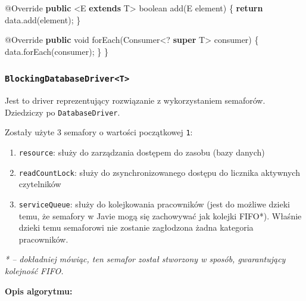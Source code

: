 \documentclass[11pt]{article}
\providecommand{\tightlist}{%
      \setlength{\itemsep}{0pt}\setlength{\parskip}{0pt}}
\newenvironment{Shaded}{}{}
\newcommand{\KeywordTok}[1]{\textcolor[rgb]{0.00,0.44,0.13}{\textbf{{#1}}}}
\newcommand{\DataTypeTok}[1]{\textcolor[rgb]{0.56,0.13,0.00}{{#1}}}
\newcommand{\FunctionTok}[1]{\textcolor[rgb]{0.02,0.16,0.49}{{#1}}}
\newcommand{\NormalTok}[1]{{#1}}
\newcommand{\ControlFlowTok}[1]{\textcolor[rgb]{0.00,0.44,0.13}{\textbf{{#1}}}}
\newcommand{\OperatorTok}[1]{\textcolor[rgb]{0.40,0.40,0.40}{{#1}}}
\newcommand{\AttributeTok}[1]{\textcolor[rgb]{0.49,0.56,0.16}{{#1}}}
\begin{document}
\begin{Shaded}
\begin{Highlighting}[]
    \AttributeTok{@Override}
    \KeywordTok{public} \OperatorTok{\textless{}}\NormalTok{E }\KeywordTok{extends}\NormalTok{ T}\OperatorTok{\textgreater{}} \DataTypeTok{boolean} \FunctionTok{add}\OperatorTok{(}\NormalTok{E element}\OperatorTok{)} \OperatorTok{\{}
        \ControlFlowTok{return}\NormalTok{ data}\OperatorTok{.}\FunctionTok{add}\OperatorTok{(}\NormalTok{element}\OperatorTok{);}
    \OperatorTok{\}}

    \AttributeTok{@Override}
    \KeywordTok{public} \DataTypeTok{void} \FunctionTok{forEach}\OperatorTok{(}\NormalTok{Consumer}\OperatorTok{\textless{}?} \KeywordTok{super}\NormalTok{ T}\OperatorTok{\textgreater{}}\NormalTok{ consumer}\OperatorTok{)} \OperatorTok{\{}
\NormalTok{        data}\OperatorTok{.}\FunctionTok{forEach}\OperatorTok{(}\NormalTok{consumer}\OperatorTok{);}
    \OperatorTok{\}}
\OperatorTok{\}}
\end{Highlighting}
\end{Shaded}

    \hypertarget{blockingdatabasedrivert}{%
\subsubsection{\texorpdfstring{\texttt{BlockingDatabaseDriver\textless{}T\textgreater{}}}{BlockingDatabaseDriver\textless T\textgreater{}}}\label{blockingdatabasedrivert}}

Jest to driver reprezentujący rozwiązanie z wykorzystaniem semaforów.
Dziedziczy po \texttt{DatabaseDriver}.

Zostały użyte 3 semafory o wartości początkowej \texttt{1}:

\begin{enumerate}
\def\labelenumi{\arabic{enumi}.}
\tightlist
\item
  \texttt{resource}: służy do zarządzania dostępem do zasobu (bazy
  danych)
\item
  \texttt{readCountLock}: służy do zsynchronizowanego dostępu do
  licznika aktywnych czytelników
\item
  \texttt{serviceQueue}: służy do kolejkowania pracowników (jest do
  możliwe dzieki temu, że semafory w Javie mogą się zachowywać jak
  kolejki FIFO*). Właśnie dzieki temu semaforowi nie zostanie zagłodzona
  żadna kategoria pracowników.
\end{enumerate}

\emph{* -- dokładniej mówiąc, ten semafor został stworzony w sposób,
gwarantujący kolejność FIFO.}

\textbf{Opis algorytmu:}
\end{document}
